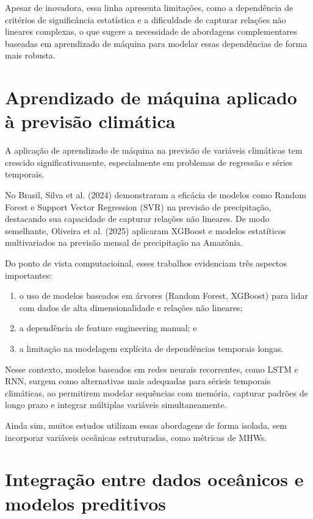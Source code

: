 	Apesar de inovadora, essa linha apresenta limitações, como a dependência de critérios de significância estatística e a dificuldade de capturar relações não lineares complexas, o que sugere a necessidade de abordagens complementares baseadas em aprendizado de máquina para modelar essas dependências de forma mais robusta.


\section{Aprendizado de máquina aplicado à previsão climática}\label{sec:ml-climatica}

	A aplicação de aprendizado de máquina na previsão de variáveis climáticas tem crescido significativamente, especialmente em problemas de regressão e séries temporais.

	No Brasil, Silva et al. (2024) demonstraram a eficácia de modelos como Random Forest e Support Vector Regression (SVR) na previsão de precipitação, destacando sua capacidade de capturar relações não lineares.
	De modo semelhante, Oliveira et al. (2025) aplicaram XGBoost e modelos estatíticos multivariados na previsão mensal de precipitação na Amazônia.

	Do ponto de vista computacioinal, esses trabalhos evidenciam três aspectos importantes:

	\begin{enumerate}
		[label=(\roman*)]
		\item o uso de modelos baseados em árvores (Random Forest, XGBoost) para lidar com dados de alta dimensionalidade e relações não lineares;
		\item a dependência de feature engineering manual; e
		\item a limitação na modelagem explícita de dependências temporais longas.
	\end{enumerate}


	Nesse contexto, modelos baseados em redes neurais recorrentes, como LSTM e RNN, surgem como alternativas mais adequadas para sérieis temporais climáticas, ao permitirem modelar sequências com memória, capturar padrões de longo prazo e integrar múltiplas variáveis simultaneamente.

	Ainda sim, muitos estudos utilizam essas abordagens de forma isolada, sem incorporar variáveis oceânicas estruturadas, como métricas de MHWs.


\section{Integração entre dados oceânicos e modelos preditivos}\label{sec:integracao}

